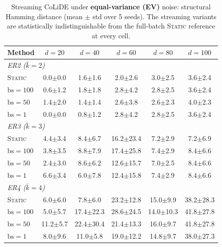 \begin{table}[t]
\centering
\caption{Streaming CoLiDE under \textbf{equal-variance (EV)} noise:
structural Hamming distance (mean $\pm$ std over 5 seeds). The streaming
variants are statistically indistinguishable from the full-batch
\textsc{Static} reference at every cell.}
\label{tab:sem-ev-shd}
\setlength{\tabcolsep}{6pt}
\begin{tabular}{l ccccc}
\toprule
\textbf{Method} & $d{=}20$ & $d{=}40$ & $d{=}60$ & $d{=}80$ & $d{=}100$ \\
\midrule
\multicolumn{6}{l}{\textit{ER2  ($\bar{k} = 2$)}} \\
\midrule
\textsc{Static} &  0.0$\pm$0.0 & 1.6$\pm$1.6 & 2.0$\pm$2.6 & 3.0$\pm$2.5 & 3.6$\pm$2.4 \\
$\mathrm{bs}{=}100$ & 0.6$\pm$1.2 & 1.8$\pm$1.8 & 2.8$\pm$4.2 & 2.8$\pm$2.5 & 3.6$\pm$2.4 \\
$\mathrm{bs}{=}50$  & 1.4$\pm$2.0 & 1.4$\pm$1.4 & 2.6$\pm$3.8 & 2.6$\pm$2.3 & 4.0$\pm$2.3 \\
$\mathrm{bs}{=}1$   & 0.0$\pm$0.0 & 0.8$\pm$1.2 & 2.8$\pm$4.2 & 2.8$\pm$2.5 & 3.6$\pm$2.4 \\
\midrule
\multicolumn{6}{l}{\textit{ER3  ($\bar{k} = 3$)}} \\
\midrule
\textsc{Static} & 4.4$\pm$3.4 & 8.4$\pm$6.7 & 16.2$\pm$23.4 & 7.2$\pm$2.9 & 7.2$\pm$6.9 \\
$\mathrm{bs}{=}100$ & 3.8$\pm$3.5 & 8.8$\pm$7.9 & 17.4$\pm$25.8 & 7.4$\pm$2.9 & 8.4$\pm$6.6 \\
$\mathrm{bs}{=}50$  & 2.4$\pm$3.0 & 8.6$\pm$6.2 & 12.6$\pm$15.7 & 7.0$\pm$2.5 & 8.4$\pm$6.6 \\
$\mathrm{bs}{=}1$   & 6.6$\pm$3.4 & 6.0$\pm$7.8 & 12.4$\pm$15.8 & 7.4$\pm$2.9 & 8.4$\pm$6.6 \\
\midrule
\multicolumn{6}{l}{\textit{ER4  ($\bar{k} = 4$)}} \\
\midrule
\textsc{Static} & 6.0$\pm$6.0 &  7.8$\pm$6.0 & 23.2$\pm$12.8 & 15.0$\pm$9.9 & 38.2$\pm$28.3 \\
$\mathrm{bs}{=}100$ & 5.0$\pm$5.7 & 17.4$\pm$22.3 & 28.6$\pm$24.5 & 14.0$\pm$10.3 & 41.8$\pm$27.8 \\
$\mathrm{bs}{=}50$  & 11.2$\pm$5.7 & 22.4$\pm$30.4 & 21.4$\pm$13.3 & 16.0$\pm$9.7 & 41.8$\pm$27.8 \\
$\mathrm{bs}{=}1$   &  8.0$\pm$9.6 & 11.0$\pm$5.8 & 19.0$\pm$12.2 & 14.8$\pm$9.7 & 38.0$\pm$27.3 \\
\bottomrule
\end{tabular}
\end{table}


